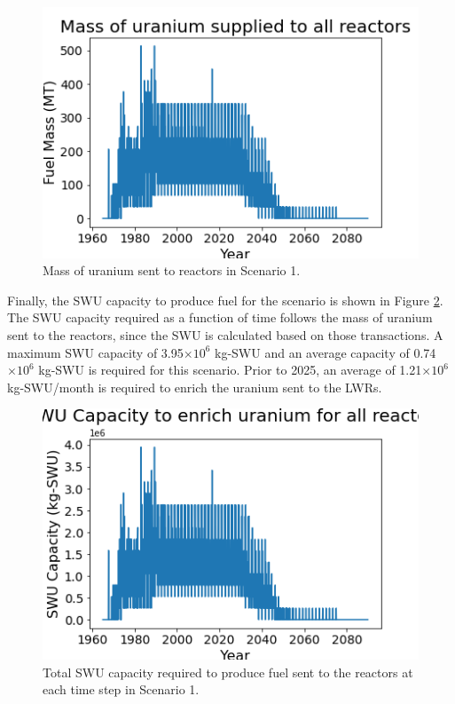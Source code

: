 \begin{figure}
    \centering 
    \includegraphics[scale=0.5]{figures/fuelsupply_scenarios_1.png}
    \caption{Mass of uranium sent to reactors in Scenario 1.}
    \label{fig:fuel_1}
\end{figure}

Finally, the \gls{SWU} capacity to produce fuel for the scenario is shown in 
Figure \ref{fig:swu_1}. The \gls{SWU} capacity required as a function of 
time follows the mass of uranium sent to the reactors, since the \gls{SWU}
is calculated based on those transactions. A maximum \gls{SWU} capacity of 
3.95$\times 10^6$ kg-\gls{SWU} and an average capacity of 0.74$\times 10^6$ 
kg-\gls{SWU} is 
required for this scenario. Prior to 2025, an average of 1.21$\times 10^6$ 
kg-\gls{SWU}/month is required to enrich the uranium sent to the \glspl{LWR}.

\begin{figure}
    \centering
    \includegraphics[scale=0.5]{figures/totalswu_scenarios_1.png}
    \caption{Total \gls{SWU} capacity required to produce fuel sent to the 
    reactors at each time step in Scenario 1.}
    \label{fig:swu_1}
\end{figure}

